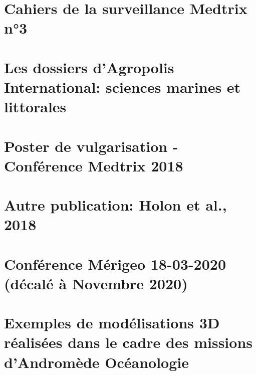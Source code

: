 \documentclass[11pt,a4paper]{book} %
\begin{document}
\begin{appendices}
	\noappendicestocpagenum
	\appendix
	
	\chapter{Cahiers de la surveillance Medtrix n°3} 
	\label{annexe-cahiers}
    
    
    \chapter[Les dossiers d'Agropolis International]{Les dossiers d'Agropolis International: sciences marines et littorales}
    \label{annexe-agropolis}
    
    
    \chapter{Poster de vulgarisation - Conférence Medtrix 2018} 
    \label{annexe-medtrix}
    
    
    \chapter{Autre publication: Holon et al., 2018} 
    \label{annexe-holon}
    
    
    \chapter{Conférence Mérigeo 18-03-2020 (décalé à Novembre 2020)} 
    \label{annexe-merigeo}
    
    
    \chapter{Exemples de modélisations 3D réalisées dans le cadre des missions d'Andromède Océanologie} 
    \label{annexe-modelisations}
    
    

\end{appendices}
\end{document}

